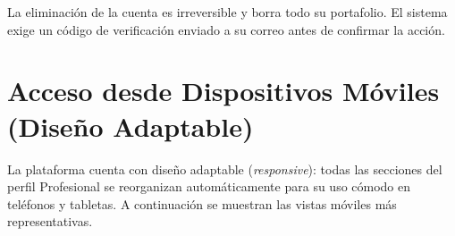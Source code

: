 \begin{AvisoAdvertencia}
La eliminación de la cuenta es irreversible y borra todo su portafolio. El sistema exige
un código de verificación enviado a su correo antes de confirmar la acción.
\end{AvisoAdvertencia}

\section{Acceso desde Dispositivos Móviles (Diseño Adaptable)}
\label{sec:prof-responsive}
La plataforma cuenta con diseño adaptable (\textit{responsive}): todas las secciones del
perfil Profesional se reorganizan automáticamente para su uso cómodo en teléfonos y
tabletas. A continuación se muestran las vistas móviles más representativas.

